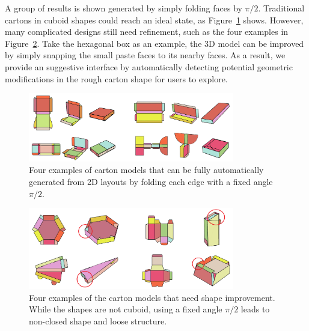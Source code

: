 A group of results is shown generated by simply folding faces by $\pi/2$.
Traditional cartons in cuboid shapes could reach an ideal state, as Figure~\ref{fig:initial-automatic} shows.
However, many complicated designs still need refinement, such as the four examples in Figure~\ref{fig:initial-need-improvement}. 
Take the hexagonal box as an example, the 3D model can be improved by simply snapping the small paste faces to its nearby faces. %
%
As a result, we provide an suggestive interface by automatically detecting potential geometric modifications in the rough carton shape for users to explore.

\begin{figure}
	\centering
	\includegraphics[width=0.8\textwidth]{images/initiala}
	\caption{Four examples of carton models that can be fully automatically generated from 2D layouts by folding each edge with a fixed angle $\pi/2$. }
	\label{fig:initial-automatic}
\end{figure}


\begin{figure}
	\centering
	\includegraphics[width=0.8\textwidth]{images/initialb}
	\caption{Four examples of the carton models that need shape improvement. While the shapes are not cuboid, using a fixed angle $\pi/2$ leads to non-closed shape and loose structure. }
	\label{fig:initial-need-improvement}
\end{figure}
